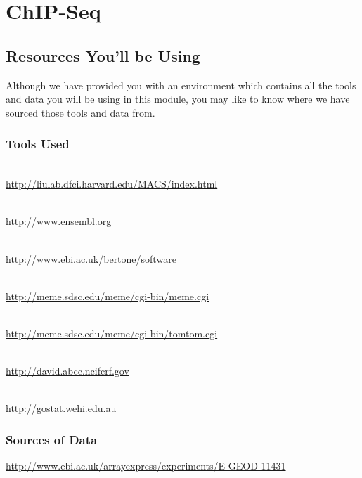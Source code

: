 \renewcommand{\moduleTitle}{ChIP-Seq}
\renewcommand{\moduleAuthors}{%
  Remco Loos, EMBL-EBI \mailto{remco@ebi.ac.uk} \\
  Myrto Kostadima \mailto{kostadim@ebi.ac.uk}
} \renewcommand{\moduleContributions}{%
  Xi Li \mailto{sean.li@csiro.au}%
}

\chapter{\moduleTitle}
\newpage

\section{Resources You'll be Using}
Although we have provided you with an environment which contains all the tools
and data you will be using in this module, you may like to know where we have
sourced those tools and data from.
 
\subsection{Tools Used}
\begin{description}[style=multiline,labelindent=0cm,align=left,leftmargin=0.5cm]
  \item[MACS]\hfill\\
  	\url{http://liulab.dfci.harvard.edu/MACS/index.html}
  \item[Ensembl]\hfill\\
  	\url{http://www.ensembl.org}
  \item[PeakAnalyzer]\hfill\\
  	\url{http://www.ebi.ac.uk/bertone/software}
  \item[MEME]\hfill\\
  	\url{http://meme.sdsc.edu/meme/cgi-bin/meme.cgi}
  \item[TOMTOM]\hfill\\
  	\url{http://meme.sdsc.edu/meme/cgi-bin/tomtom.cgi}  
  \item[DAVID]\hfill\\
  	\url{http://david.abcc.ncifcrf.gov}
  \item[GOstat]\hfill\\
    \url{http://gostat.wehi.edu.au}
\end{description}

\subsection{Sources of Data}
  \url{http://www.ebi.ac.uk/arrayexpress/experiments/E-GEOD-11431}

